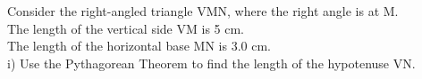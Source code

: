 \documentclass[preview]{standalone}
\begin{document}
\begin{center}
\begin{minipage}{12cm}
\raggedright Consider the right-angled triangle VMN, where the right angle is at M. \\
 The length of the vertical side VM is 5 cm. \\
 The length of the horizontal base MN is 3.0 cm. \\
 i) Use the Pythagorean Theorem to find the length of the hypotenuse VN.
\end{minipage}
\end{center}
\end{document}
